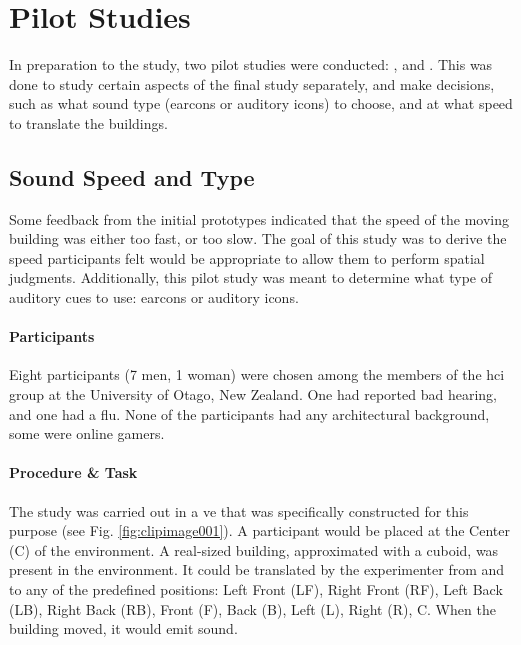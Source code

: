 \section{Pilot Studies}
In preparation to the  study, two pilot studies were conducted: , and . This was done to study certain aspects of the final study separately, and make decisions, such as what sound type (earcons or auditory icons) to choose, and at what speed to translate the buildings.
















\subsection{Sound Speed and Type}
\label{study_one}
Some feedback from the initial prototypes indicated that the speed of the moving building was either too fast, or too slow. The goal of this study was to derive the speed participants felt would be appropriate to allow them to perform spatial judgments. Additionally, this pilot study was meant to determine what type of auditory cues to use: earcons or auditory icons.

\paragraph{Participants}
Eight participants (7 men, 1 woman) were chosen among the members of the \gls{hci} group at the University of Otago, New Zealand. One had reported bad hearing, and one had a flu.  None of the participants had any architectural background, some were online gamers.

\paragraph{Procedure \& Task}
The study was carried out in a \gls{ve} that was specifically constructed for this purpose (see Fig. \ref{fig:clipimage001}). A participant would be placed at the Center (C) of the environment. A real-sized building, approximated with a cuboid, was present in the environment. It could be translated by the experimenter from and to any of the predefined positions: Left Front (LF), Right Front (RF), Left Back (LB), Right Back (RB), Front (F), Back (B), Left (L), Right (R), C. When the building moved, it would emit sound.


